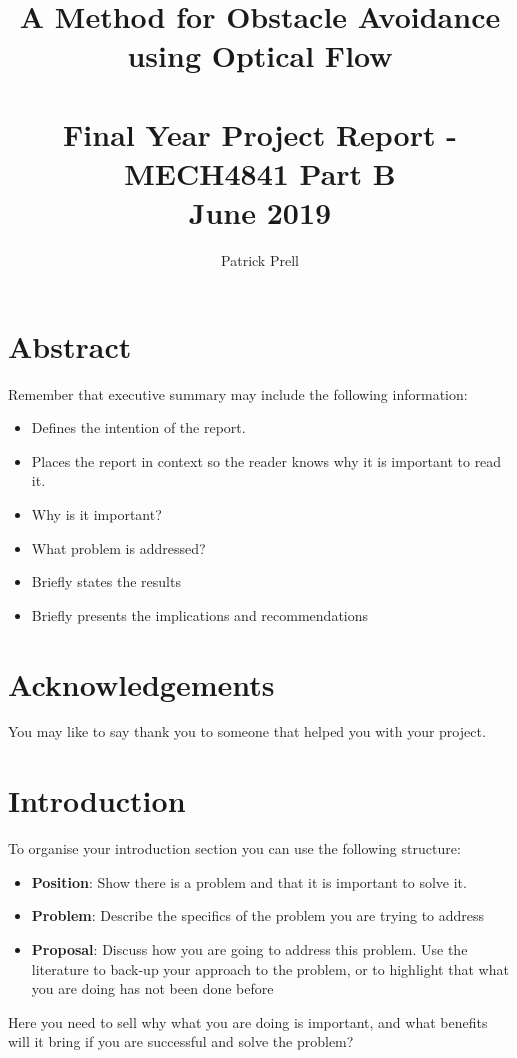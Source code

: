 \documentclass{UoNMCHA}
\numberwithin{equation}{section}
\begin{document}
\title{A Method for Obstacle Avoidance using Optical Flow \\ \ \\
{\small Final Year Project Report - MECH4841 Part B  \\June 2019}}
\author[UoNMCHA]{Patrick Prell}
\address[UoNMCHA]{
Student of Mechatronics Engineering,\\
The University of Newcastle, Callaghan, NSW 2308, AUSTRALIA \\
Student Number: 3204734 \\
E-mail: \href{mailto:Patrick.Prell@uon.edu.au}{\textsf{Patrick.Prell@uon.edu.au}}}
\maketitle
\onecolumn

\vspace{-5mm}
\section*{Abstract}
\vspace{-3mm}
Remember that executive summary may include the following information:
\begin{itemize}
    \item Defines the intention of the report.
    \item Places the report in context so the reader knows why it is important to read it.
    \item Why is it important?
    \item What problem is addressed?
    \item Briefly states the results
    \item Briefly presents the implications and recommendations
\end{itemize}
\vspace{-2mm}
\section*{Acknowledgements}
\vspace{-3mm}
You may like to say thank you to someone that helped you with your project.
\newpage
\tableofcontents
\newpage
\section{Introduction}
To organise your introduction section you can use the following structure:
\begin{itemize}
    \item \textbf{Position}: Show there is a problem and that it is important to solve it.
    \item \textbf{Problem}: Describe the specifics of the problem you are trying to address
    \item \textbf{Proposal}: Discuss how you are going to address this problem. Use the literature to back-up your approach to the problem, or to highlight that what you are doing has not been done before
\end{itemize}
Here you need to sell why what you are doing is important, and what benefits will it bring if you are successful and solve the problem? 
%
\end{document}

